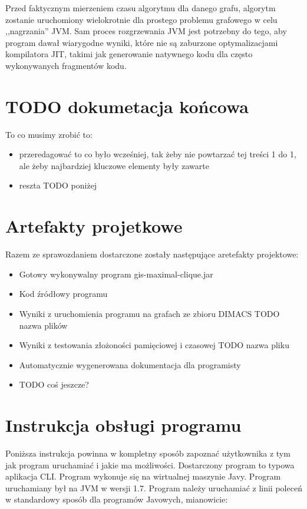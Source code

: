 \documentclass[12pt, a4paper]{article}
\begin{document}
Przed faktycznym mierzeniem czasu algorytmu dla danego grafu, algorytm zostanie uruchomiony wielokrotnie dla prostego problemu grafowego w celu ,,nagrzania'' JVM. Sam proces rozgrzewania JVM jest potrzebny do tego, aby program dawał wiarygodne wyniki, które nie są zaburzone optymalizacjami kompilatora JIT, takimi jak generowanie natywnego kodu dla często wykonywanych fragmentów kodu.

\section{TODO dokumetacja końcowa}
To co musimy zrobić to:
\begin{itemize}
\item przeredagować to co było wcześniej, tak żeby nie powtarzać tej treści 1 do 1, ale żeby najbardziej kluczowe elementy były zawarte
\item reszta TODO poniżej
\end{itemize}

\section{Artefakty projetkowe}
Razem ze sprawozdaniem dostarczone zostały następujące aretefakty projektowe:
\begin{itemize}
\item Gotowy wykonywalny program gis-maximal-clique.jar
\item Kod źródłowy programu
\item Wyniki z uruchomienia programu na grafach ze zbioru DIMACS TODO nazwa plików
\item Wyniki z testowania złożoności pamięciowej i czasowej TODO nazwa pliku
\item Automatycznie wygenerowana dokumentacja dla programisty
\item TODO coś jeszcze?
\end{itemize}

\section{Instrukcja obsługi programu}
Poniższa instrukcja powinna w kompletny sposób zapoznać użytkownika z tym jak program uruchamiać i jakie ma możliwości. Dostarczony program to typowa aplikacja CLI. Program wykonuje się na wirtualnej maszynie Javy. Program uruchamiany był na JVM w wersji 1.7. Program należy uruchamiać z linii poleceń w standardowy sposób dla programów Javowych, mianowicie:
\end{document}
